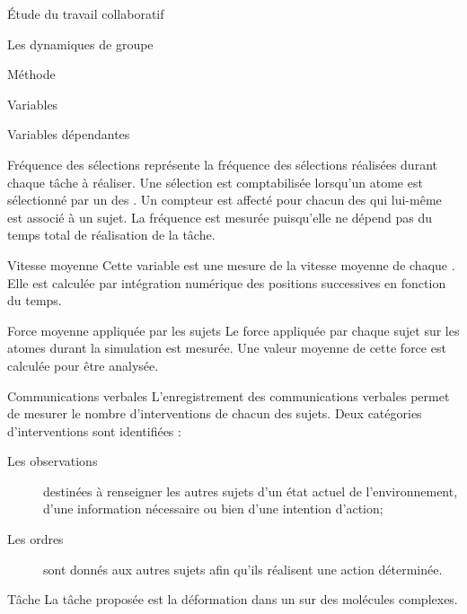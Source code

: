 \documentclass[myfrancais]{mythesis}
\begin{document}
\begin{mypart}{Étude du travail collaboratif}
\begin{mychapter}{Les dynamiques de groupe}
\begin{mysection}{Méthode}
\begin{mysubsection}{Variables}
\begin{mysubsubsection}{Variables dépendantes}
						\begin{myparagraph}{ Fréquence des sélections}
							 représente la fréquence des sélections réalisées durant chaque tâche à réaliser.
							Une sélection est comptabilisée lorsqu'un atome est sélectionné par un des .
							Un compteur est affecté pour chacun des  qui lui-même est associé à un sujet.
							La fréquence est mesurée puisqu'elle ne dépend pas du temps total de réalisation de la tâche.
						\end{myparagraph}
						\begin{myparagraph}{ Vitesse moyenne}
							Cette variable est une mesure de la vitesse moyenne de chaque .
							Elle est calculée par intégration numérique des positions successives en fonction du temps.
						\end{myparagraph}
						\begin{myparagraph}{ Force moyenne appliquée par les sujets}
							Le force appliquée par chaque sujet sur les atomes durant la simulation est mesurée.
							Une valeur moyenne de cette force est calculée pour être analysée.
						\end{myparagraph}
						\begin{myparagraph}{ Communications verbales}
							L'enregistrement des communications verbales permet de mesurer le nombre d'interventions de chacun des sujets.
							Deux catégories d'interventions sont identifiées :
							\begin{description}
								\item[Les observations] destinées à renseigner les autres sujets d'un état actuel de l'environnement, d'une information nécessaire ou bien d'une intention d'action;
								\item[Les ordres] sont donnés aux autres sujets afin qu'ils réalisent une action déterminée.
							\end{description}
						\end{myparagraph}
					\end{mysubsubsection}
				\end{mysubsection}
				\begin{mysubsection}[sse-exp3-Tache]{Tâche}
					La tâche proposée est la déformation dans un  sur des molécules complexes.


\end{mysubsection}
\end{mysection}
\end{mychapter}
\end{mypart}
\end{document}
